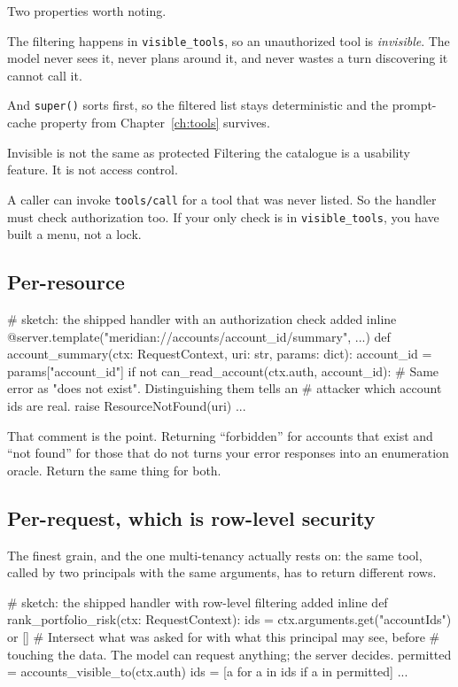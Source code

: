 Two properties worth noting.

The filtering happens in \texttt{visible\_tools}, so an unauthorized tool is \emph{invisible}. The model never sees it,
never plans around it, and never wastes a turn discovering it cannot call it.

And \texttt{super()} sorts first, so the filtered list stays deterministic and
the prompt-cache property from Chapter~\ref{ch:tools} survives.

\begin{dangerbox}{Invisible is not the same as protected}
Filtering the catalogue is a usability feature. It is not access control.

A caller can invoke \texttt{tools/call} for a tool that was never listed. So the
handler must check authorization too. If your only check is in
\texttt{visible\_tools}, you have built a menu, not a lock.
\end{dangerbox}

\subsection{Per-resource}

\begin{py}
# sketch: the shipped handler with an authorization check added inline
@server.template("meridian://accounts/{account_id}/summary", ...)
def account_summary(ctx: RequestContext, uri: str, params: dict):
    account_id = params["account_id"]
    if not can_read_account(ctx.auth, account_id):
        # Same error as "does not exist". Distinguishing them tells an
        # attacker which account ids are real.
        raise ResourceNotFound(uri)
    ...
\end{py}

That comment is the point. Returning ``forbidden'' for accounts that exist and
``not found'' for those that do not turns your error responses into an
enumeration oracle. Return the same thing for both.

\subsection{Per-request, which is row-level security}

The finest grain, and the one multi-tenancy actually rests on: the same tool,
called by two principals with the same arguments, has to return different rows.

\begin{py}
# sketch: the shipped handler with row-level filtering added inline
def rank_portfolio_risk(ctx: RequestContext):
    ids = ctx.arguments.get("accountIds") or []
    # Intersect what was asked for with what this principal may see, before
    # touching the data. The model can request anything; the server decides.
    permitted = accounts_visible_to(ctx.auth)
    ids = [a for a in ids if a in permitted]
    ...
\end{py}

